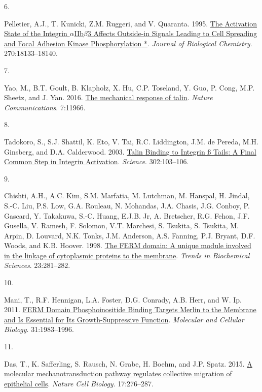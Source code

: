 \documentclass[
  twocolumn]{biophys-new-mod}
\newlength{\cslhangindent}
\newlength{\csllabelwidth}
\newlength{\cslentryspacingunit} %
\newenvironment{CSLReferences}[2] %
 {%
  \setlength{\parindent}{0pt}
  \ifodd #1
  \let\oldpar\par
  \def\par{\hangindent=\cslhangindent\oldpar}
  \fi
  \setlength{\parskip}{#2\cslentryspacingunit}
 }%
 {}
\newcommand{\CSLLeftMargin}[1]{\parbox[t]{\csllabelwidth}{#1}}
\newcommand{\CSLRightInline}[1]{\parbox[t]{\linewidth - \csllabelwidth}{#1}\break}
\begin{document}
\begin{CSLReferences}{0}{0}
\leavevmode{}%
\CSLLeftMargin{6. }%
\CSLRightInline{Pelletier, A.J., T. Kunicki, Z.M. Ruggeri, and V.
Quaranta. 1995. \href{https://doi.org/10.1074/jbc.270.30.18133}{The
{Activation State} of the {Integrin \(\alpha\)IIb\(\beta\)3 Affects
Outside-in Signals Leading} to {Cell Spreading} and {Focal Adhesion
Kinase Phosphorylation} *}. \emph{Journal of Biological Chemistry}.
270:18133--18140.}

\leavevmode{}%
\CSLLeftMargin{7. }%
\CSLRightInline{Yao, M., B.T. Goult, B. Klapholz, X. Hu, C.P. Toseland,
Y. Guo, P. Cong, M.P. Sheetz, and J. Yan. 2016.
\href{https://doi.org/10.1038/ncomms11966}{The mechanical response of
talin}. \emph{Nature Communications}. 7:11966.}

\leavevmode{}%
\CSLLeftMargin{8. }%
\CSLRightInline{Tadokoro, S., S.J. Shattil, K. Eto, V. Tai, R.C.
Liddington, J.M. de Pereda, M.H. Ginsberg, and D.A. Calderwood. 2003.
\href{https://doi.org/10.1126/science.1086652}{Talin {Binding} to
{Integrin} ß {Tails}: {A Final Common Step} in {Integrin Activation}}.
\emph{Science}. 302:103--106.}

\leavevmode{}%
\CSLLeftMargin{9. }%
\CSLRightInline{Chishti, A.H., A.C. Kim, S.M. Marfatia, M. Lutchman, M.
Hanspal, H. Jindal, S.-C. Liu, P.S. Low, G.A. Rouleau, N. Mohandas, J.A.
Chasis, J.G. Conboy, P. Gascard, Y. Takakuwa, S.-C. Huang, E.J.B. Jr, A.
Bretscher, R.G. Fehon, J.F. Gusella, V. Ramesh, F. Solomon, V.T.
Marchesi, S. Tsukita, S. Tsukita, M. Arpin, D. Louvard, N.K. Tonks, J.M.
Anderson, A.S. Fanning, P.J. Bryant, D.F. Woods, and K.B. Hoover. 1998.
\href{https://doi.org/10.1016/S0968-0004(98)01237-7}{The {FERM} domain:
A unique module involved in the linkage of cytoplasmic proteins to the
membrane}. \emph{Trends in Biochemical Sciences}. 23:281--282.}

\leavevmode{}%
\CSLLeftMargin{10. }%
\CSLRightInline{Mani, T., R.F. Hennigan, L.A. Foster, D.G. Conrady, A.B.
Herr, and W. Ip. 2011. \href{https://doi.org/10.1128/MCB.00609-10}{{FERM
Domain Phosphoinositide Binding Targets Merlin} to the {Membrane} and
{Is Essential} for {Its Growth-Suppressive Function}}. \emph{Molecular
and Cellular Biology}. 31:1983--1996.}

\leavevmode{}%
\CSLLeftMargin{11. }%
\CSLRightInline{Das, T., K. Safferling, S. Rausch, N. Grabe, H. Boehm,
and J.P. Spatz. 2015. \href{https://doi.org/10.1038/ncb3115}{A molecular
mechanotransduction pathway regulates collective migration of epithelial
cells}. \emph{Nature Cell Biology}. 17:276--287.}


\end{CSLReferences}
\end{document}
